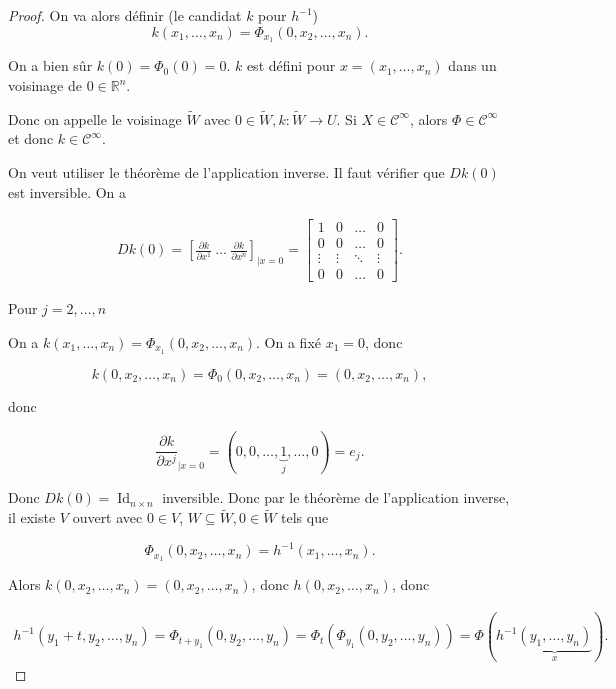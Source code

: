 \documentclass[french]{article}
\theoremstyle{definition}
\theoremstyle{remark}
\begin{document}
\begin{proof}
  On va alors définir (le candidat \(k\) pour \(h ^{-1}\)) \[k(x_1, \dots, x_n) = \Phi _{x_1}(0, x_2, \dots,x_n).\]

  On a bien sûr \(k(0) = \Phi_0(0) = 0\). \(k\) est défini pour \(x = (x_1, \dots, x_n)\) dans un voisinage de \(0 \in \mathbb{R}^n\).

  Donc on appelle le voisinage \(\tilde{W}\) avec \(0 \in \tilde{W}, k : \tilde{W} \longrightarrow U\). Si \(X \in \mathcal{C}^\infty\), alors \(\Phi \in \mathcal{C}^\infty\) et donc \(k \in \mathcal{C}^\infty\).


  On veut utiliser le théorème de l'application inverse. Il faut vérifier que \(D k(0)\) est inversible. On a

  \begin{gather*}
    Dk(0) = \left[ \frac{\partial k }{\partial x ^{1}} \ \dots \ \frac{\partial k }{\partial x ^{n}}  \right]_{\mid x=0} = \begin{bmatrix}
      1 & 0 & \dots & 0 \\
      0 & 0 & \dots & 0 \\
      \vdots & \vdots & \ddots & \vdots \\
      0 & 0 & \dots & 0
  \end{bmatrix}.
  \end{gather*}

  Pour \(j = 2, \dots,n\)

  On a \(k(x_1, \dots, x_n) = \Phi _{x_1}(0, x_2, \dots, x_n)\). On a fixé \(x_1 = 0\), donc

  \[k(0, x_2, \dots, x_n) = \Phi_0(0, x_2, \dots, x_n) = (0, x_2, \dots, x_n), \]

  donc

  \[\frac{\partial k }{\partial x ^{j}}_{\mid x=0} = (0,0, \dots, \underbrace{1}_{j}, \dots, 0) =e_j. \]

  Donc \(D k(0) = \operatorname{Id}_{n \times n}\) inversible. Donc par le théorème de l'application inverse, il existe \(V\) ouvert avec \(0 \in V\), \(W \subseteq \tilde{W}, 0 \in \tilde{W}\) tels que

  \[\Phi _{x_1}(0, x_2, \dots, x_n) = h ^{-1}(x_1, \dots, x_n).\]

  Alors \(k(0, x_2, \dots, x_n) = (0, x_2, \dots, x_n)\), donc \(h(0, x_2, \dots, x_n)\), donc

  \begin{gather*}
    h ^{-1}(y_1+t, y_2, \dots, y_n) = \Phi _{t+y_1}(0, y_2, \dots, y_n) = \Phi_t(\Phi _{y_1}(0, y_2, \dots, y_n)) = \Phi (h ^{-1}\underbrace{(y_1, \dots, y_n)}_{x}).
  \end{gather*}
\end{proof}
\end{document}
